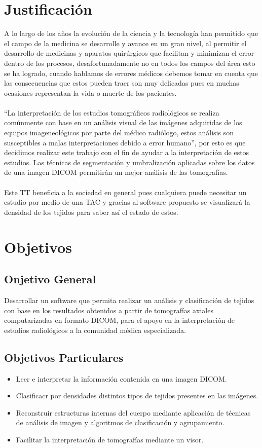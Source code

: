 \documentclass[12pt]{report}
\begin{document}
\section{Justificación}
A lo largo de los años la evolución de la ciencia y la tecnología han permitido que el campo de la medicina se desarrolle y avance en un gran nivel, al permitir el desarrollo de medicinas y aparatos quirúrgicos que facilitan y minimizan el error dentro de los procesos, desafortunadamente no en todos los campos del área esto se ha logrado, cuando hablamos de errores médicos debemos tomar en cuenta que las consecuencias que estos pueden traer son muy delicadas pues en muchas ocasiones representan la vida o muerte de los pacientes.\\ \\
“La interpretación de los estudios tomográficos radiológicos se realiza comúnmente con base en un análisis visual de las imágenes adquiridas de los equipos imageneológicos por parte del médico radiólogo, estos análisis son susceptibles a malas interpretaciones debido a error humano”, por esto es que decidimos realizar este trabajo con el fin de ayudar a la interpretación de estos estudios.
Las técnicas de segmentación y umbralización aplicadas sobre los datos de una imagen DICOM permitirán un mejor análisis de las tomografías.\\ \\
Este TT beneficia a la sociedad en general pues cualquiera puede necesitar un estudio por medio de una TAC y gracias al software propuesto se visualizará la densidad de los tejidos para saber así el estado de estos.

\section{Objetivos}
\subsection{Onjetivo General}
Desarrollar un software que permita realizar un análisis y clasificación de tejidos con base en los resultados obtenidos a partir de tomografías axiales computarizadas en formato DICOM, para el apoyo en la interpretación de estudios radiológicos a la comunidad médica especializada.
\subsection{Objetivos Particulares}
\begin{itemize}
\item Leer e interpretar la información contenida en una imagen DICOM.
\item Clasificacr por densidades distintos tipos de tejidos presentes en las imágenes.
\item Reconstruir estructuras internas del cuerpo mediante aplicación de técnicas de análisis de imagen y algoritmos de clasificación y agrupamiento.
\item Facilitar la interpretación de tomografías mediante un visor.
\end{itemize}
\end{document}
